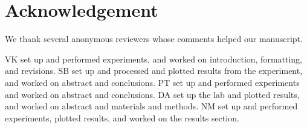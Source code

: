 ﻿\documentclass[10pt,journal,twoside]{IEEEtran}
\begin{document}
\section{Acknowledgement}
We thank several anonymous reviewers whose comments helped our manuscript.  

VK set up and performed experiments, and worked on introduction, formatting, and revisions. SB set up and processed and plotted results from the experiment, and worked on abstract and conclusions. PT set up and performed experiments and worked on abstract and conclusions. DA set up the lab and plotted results, and worked on abstract and materials and methods. NM set up and performed experiments, plotted results, and worked on the results section. 


\nocite{libre,tipler}


\end{document}
